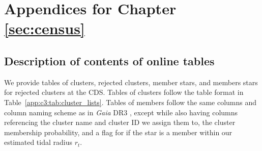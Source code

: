 \begin{table}
\begin{tabular}{cccc|cccc}
\hline

\end{tabular}

\normalsize


\end{table}


\clearpage


\section{Appendices for Chapter \ref{sec:census}}

\subsection{Description of contents of online tables}\label{app:c3:tables}

We provide tables of clusters, rejected clusters, member stars, and members stars for rejected clusters at the CDS. Tables of clusters follow the table format in Table~\ref{app:c3:tab:cluster_lists}. Tables of members follow the same columns and column naming scheme as in \emph{Gaia} DR3 \citep{gaia_collaboration_gaia_2022}, except while also having columns referencing the cluster name and cluster ID we assign them to, the cluster membership probability, and a flag for if the star is a member within our estimated tidal radius $r_t$.

